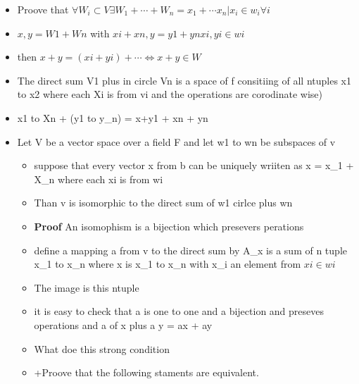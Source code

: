 \documentclass[twocolumn]{article}
\providecommand{\tightlist}{%
  \setlength{\itemsep}{0pt}\setlength{\parskip}{0pt}}
\begin{document}
\begin{itemize}
\tightlist
\item
  Proove that
  \(\forall W_i \subset V \exists W_1 + \cdots + W_n = x_1 + \cdots x_n | x_i \in w_i \forall i\)
\item
  \(x,y = W1 + Wn\) with \(xi + xn , y= y1 + yn xi,yi \in wi\)
\item
  then \(x+y = (xi + yi ) + \cdots \Leftrightarrow x + y \in W\)
\item
  The direct sum V1 plus in circle Vn is a space of f consitiing of all
  ntuples x1 to x2 where each Xi is from vi and the operations are
  corodinate wise)
\item
  x1 to Xn + (y1 to y\_n) = x+y1 + xn + yn
\item
  Let V be a vector space over a field F and let w1 to wn be subspaces
  of v

  \begin{itemize}
  \tightlist
  \item
    suppose that every vector x from b can be uniquely wriiten as x =
    x\_1 + X\_n where each xi is from wi
  \item
    Than v is isomorphic to the direct sum of w1 cirlce plus wn
  \item
    \textbf{Proof} An isomophism is a bijection which presevers
    perations
  \item
    define a mapping a from v to the direct sum by A\_x is a sum of n
    tuple x\_1 to x\_n where x is x\_1 to x\_n with x\_i an element from
    \(xi \in wi\)
  \item
    The image is this ntuple
  \item
    it is easy to check that a is one to one and a bijection and
    preseves operations and a of x plus a y = ax + ay
  \item
    What doe this strong condition
  \item
    +Proove that the following staments are equivalent.
  \end{itemize}


\end{itemize}
\end{document}
